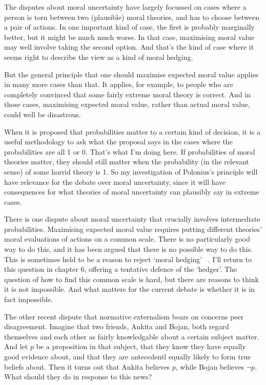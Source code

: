 The disputes about moral uncertainty have largely focussed on cases where a person is torn between two (plausible) moral theories, and has to choose between a pair of actions. In one important kind of case, the first is probably marginally better, but it might be much much worse. In that case, maximising moral value may well involve taking the second option. And that's the kind of case where it seems right to describe the view as a kind of moral hedging.

But the general principle that one should maximise expected moral value applies in many more cases than that. It applies, for example, to people who are completely convinced that some fairly extreme moral theory is correct. And in those cases, maximising expected moral value, rather than actual moral value, could well be disastrous.

When it is proposed that probabilities matter to a certain kind of decision, it is a useful methodology to ask what the proposal says in the cases where the probabilities are all 1 or 0. That's what I'm doing here. If probabilities of moral theories matter, they should still matter when the probability (in the relevant sense) of some horrid theory is 1. So my investigation of Polonius's principle will have relevance for the debate over moral uncertainty, since it will have consequences for what theories of moral uncertainty can plausibly say in extreme cases.

There is one dispute about moral uncertainty that crucially involves intermediate probabilities. Maximising expected moral value requires putting different theories' moral evaluations of actions on a common scale. There is no particularly good way to do this, and it has been argued that there is no possible way to do this. This is sometimes held to be a reason to reject `moral hedging' ~\citep{Hedden2015}. I'll return to this question in chapter 6, offering a tentative defence of the `hedger'. The question of how to find this common scale is hard, but there are reasons to think it is not impossible. And what matters for the current debate is whether it is in fact impossible.

The other recent dispute that normative externalism bears on concerns peer disagreement. Imagine that two friends, \gls{Ankita} and \gls{Bojan}, both regard themselves and each other as fairly knowledgable about a certain subject matter. And let $p$ be a proposition in that subject, that they know they have equally good evidence about, and that they are antecedentl equally likely to form true beliefs about. Then it turns out that \gls{Ankita} believes $p$, while \gls{Bojan} believes $\neg p$. What should they do in response to this news?


